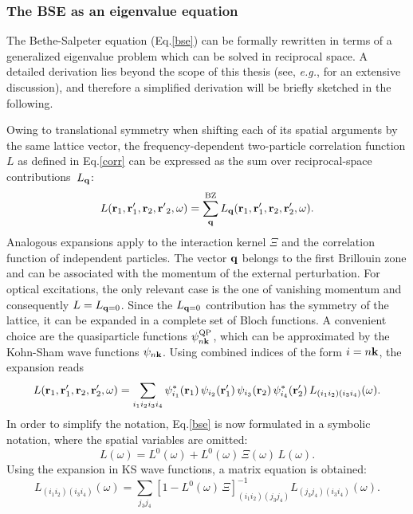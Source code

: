 \subsubsection{The BSE as an eigenvalue equation}\label{sec_bseeigen}
The Bethe-Salpeter equation (Eq.\;\eqref{bse}) can be formally rewritten in terms of a generalized eigenvalue problem which can be solved in reciprocal space. A detailed derivation lies beyond the scope of this thesis (see, \textit{e.g.},\cite{pusching_phd,Vorwerk_2019} for an extensive discussion), and therefore a simplified derivation will be briefly sketched in the following.\par
Owing to translational symmetry when shifting each of its spatial arguments by the same lattice vector,  the  frequency-dependent two-particle correlation function $L$ as defined in Eq.\;\eqref{corr} can be expressed as the sum over reciprocal-space contributions~$L_{\mathbf{q}}$:
%
\begin{equation}
    L(\mathbf{r}_1,\mathbf{r}'_1,\mathbf{r}_2,\mathbf{r'}_2,\omega) = \sum^\text{BZ}_{\mathbf{q}} L_{\mathbf{q}}(\mathbf{r}_1,\mathbf{r}'_1,\mathbf{r}_2,\mathbf{r}'_2,\omega).
\end{equation}
%
Analogous expansions apply to the interaction kernel $\Xi$ and the correlation function of independent particles. The vector $\mathbf{q}$ belongs to the first Brillouin zone and can be associated with the momentum of the external perturbation.  For optical excitations, the only  relevant case is the  one of vanishing momentum and consequently $L=L_{\mathbf{q}=0}$. Since the $L_{\mathbf{q}=0}$ contribution has the symmetry of the lattice, it can be expanded in a complete set of Bloch functions. A convenient choice are the quasiparticle functions $\psi^\text{QP}_{n\mathbf{k}}$, which can be approximated by the Kohn-Sham wave functions $\psi_{n\mathbf{k}}$. Using combined indices of the form $i=n\mathbf{k}$, the expansion reads
%
\begin{equation}
     L(\mathbf{r}_1,\mathbf{r}'_1,\mathbf{r}_2,\mathbf{r}'_2,\omega) = \sum_{i_1i_2i_3i_4}\psi^*_{i_1}(\mathbf{r}_1)\,\psi_{i_2}(\mathbf{r}'_1)\,\psi_{i_3}(\mathbf{r}_2)\,\psi^*_{i_4}(\mathbf{r}'_2)\,L_{(i_1i_2)(i_3i_4)}(\omega).
\end{equation}
%
In order to simplify the notation, Eq.\;\eqref{bse} is now formulated in a symbolic notation, where the spatial variables  are omitted:
%
\begin{equation}\label{bse_symb}
    L(\omega) = L^0(\omega) + L^0(\omega)\,\Xi(\omega)\,L(\omega).
\end{equation}
%
Using the expansion in KS wave functions, a matrix equation is obtained:
%
\begin{equation}\label{matrixcorr}
    L_{(i_1i_2)(i_3i_4)}(\omega) = \sum_{j_3j_4}\left[1-L^0(\omega)\,\Xi\right]^{-1}_{(i_1i_2)(j_3j_4)}L_{(j_3j_4)(i_3i_4)}(\omega).
\end{equation}
